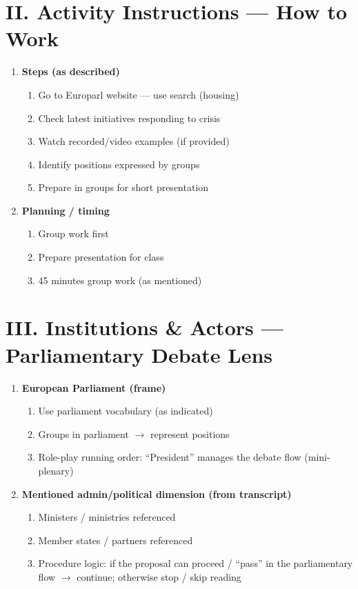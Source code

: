 \documentclass[10pt,a4paper]{article}
\begin{document}
\section*{II. Activity Instructions --- How to Work}
\begin{enumerate}[label=\Alph*.]
\item \textbf{Steps (as described)}
  \begin{enumerate}[label=\arabic*.]
  \item Go to Europarl website --- use search (housing)
  \item Check latest initiatives responding to crisis
  \item Watch recorded/video examples (if provided)
  \item Identify positions expressed by groups
  \item Prepare in groups for short presentation
  \end{enumerate}
\item \textbf{Planning / timing}
  \begin{enumerate}[label=\arabic*.]
  \item Group work first
  \item Prepare presentation for class
  \item 45 minutes group work (as mentioned)
  \end{enumerate}
\end{enumerate}

\section*{III. Institutions \& Actors --- Parliamentary Debate Lens}
\begin{enumerate}[label=\Alph*.]
\item \textbf{European Parliament (frame)}
  \begin{enumerate}[label=\arabic*.]
  \item Use parliament vocabulary (as indicated)
  \item Groups in parliament $\rightarrow$ represent positions
  \item Role-play running order: ``President'' manages the debate flow (mini-plenary)
  \end{enumerate}
\item \textbf{Mentioned admin/political dimension (from transcript)}
  \begin{enumerate}[label=\arabic*.]
  \item Ministers / ministries referenced
  \item Member states / partners referenced
  \item Procedure logic: if the proposal can proceed / ``pass'' in the parliamentary flow $\rightarrow$ continue; otherwise stop / skip reading
  \end{enumerate}
\end{enumerate}
\end{document}
